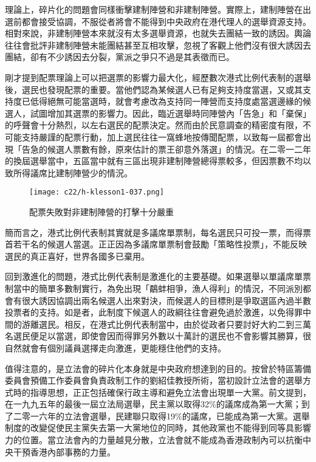 理論上，碎片化的問題會同樣衝擊建制陣營和非建制陣營。實際上，建制陣營在出選前都會接受協調，不服從者將會不能得到中央政府在港代理人的選舉資源支持。相對來說，非建制陣營本來就沒有太多選舉資源，也就失去團結一致的誘因。輿論往往會批評非建制陣營未能團結甚至互相攻擊，忽視了客觀上他們沒有很大誘因去團結，卻有不少誘因去分裂，黨派之爭只不過是其表徵而已。

剛才提到配票理論上可以把選票的影響力最大化，經歷數次港式比例代表制的選舉後，選民也發現配票的重要。當他們認為某候選人已有足夠支持度當選，又或其支持度已低得絕無可能當選時，就會考慮改為支持同一陣營而支持度處當選邊緣的候選人，試圖增加其選票的影響力。因此，臨近選舉時同陣營內「告急」和「棄保」的呼聲會十分熱烈，以左右選民的配票決定。然而由於民意調查的精密度有限，不可能支持嚴謹的配票行動，加上選民往往一窩蜂地按傳聞配票，以致每一屆都會出現「告急的候選人票數有餘，原來估計的票王卻意外落選」的情況。在二零一二年的換屆選舉當中，五區當中就有三區出現非建制陣營總得票較多，但因票數不均以致所得議席比建制陣營少的情況。

\begin{figure}[htbp]
    \centering
    \texttt{[image: c22/h-klesson1-037.png]}
    \caption{配票失敗對非建制陣營的打擊十分嚴重} 
\end{figure}

簡而言之，港式比例代表制其實就是多議席單票制，每名選民只可投一票，而得票首若干名的候選人當選。正正因為多議席單票制會鼓勵「策略性投票」，不能反映選民的真正喜好，世界各國多已棄用。

回到激進化的問題，港式比例代表制是激進化的主要基礎。如果選舉以單議席單票制當中的簡單多數制實行，為免出現「鷸蚌相爭，漁人得利」的情況，不同派別都會有很大誘因協調出兩名候選人出來對決，而候選人的目標則是爭取選區內過半數投票者的支持。如是者，此制度下候選人的政綱往往會避免過於激進，以免得罪中間的游離選民。相反，在港式比例代表制當中，由於從政者只要討好大約二到三萬名選民便足以當選，即使會因而得罪另外數以十萬計的選民也不會影響其勝算，很自然就會有個別議員選擇走向激進，更能穩住他們的支持。

值得注意的，是立法會的碎片化本身就是中央政府想達到的目的。按曾於特區籌備委員會預備工作委員會負責政制工作的劉紹佳教授所術，當初設計立法會的選舉方式時的指導思想，正正包括確保行政主導和避免立法會出現單一大黨。前文提到，在一九九五年的最後一屆立法局選舉，民主黨以取得32\%的議席成為第一大黨；到了二零一六年的立法會選舉，民建聯只取得19\%的議席，已能成為第一大黨。選舉制度的改變促使民主黨失去第一大黨地位的同時，其他政黨也不能得到同等具影響力的位置。當立法會內的力量越見分散，立法會就不能成為香港政制內可以抗衡中央干預香港內部事務的力量。

